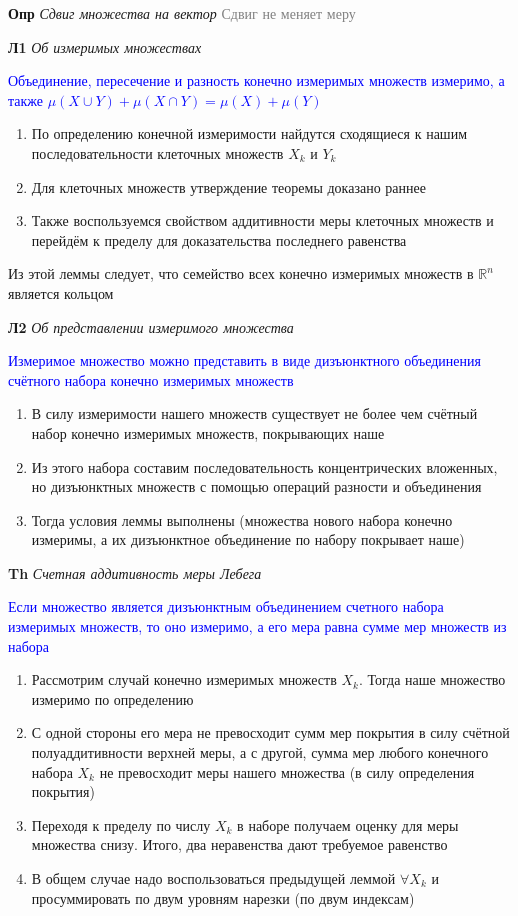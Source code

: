 \textbf{Опр} \textit{Сдвиг множества на вектор} \textcolor{gray}{Сдвиг не меняет меру}

\textbf{Л1} \textit{Об измеримых множествах}

\textcolor{blue}{Объединение, пересечение и разность конечно измеримых множеств измеримо, а также $\mu (X \cup Y) + \mu (X \cap Y) = \mu (X) + \mu (Y)$}

\begin{enumerate}
    \item По определению конечной измеримости найдутся сходящиеся к нашим последовательности клеточных множеств $X_k$ и $Y_k$
    \item Для клеточных множеств утверждение теоремы доказано раннее
    \item Также воспользуемся свойством аддитивности меры клеточных множеств и перейдём к пределу для доказательства
    последнего равенства
\end{enumerate}

Из этой леммы следует, что семейство всех конечно измеримых множеств в $\mathbb{R}^n$ является кольцом

\textbf{Л2} \textit{Об представлении измеримого множества}

\textcolor{blue}{Измеримое множество можно представить в виде дизъюнктного объединения счётного набора конечно измеримых множеств}

\begin{enumerate}
    \item В силу измеримости нашего множеств существует не более чем счётный набор конечно измеримых множеств, покрывающих наше
    \item Из этого набора составим последовательность концентрических вложенных, но дизъюнктных множеств с помощью операций разности и объединения
    \item Тогда условия леммы выполнены (множества нового набора конечно измеримы, а их дизъюнктное объединение по набору покрывает наше)
\end{enumerate}

\textbf{Th} \textit{Счетная аддитивность меры Лебега}

\textcolor{blue}{Если множество является дизъюнктным объединением счетного набора измеримых множеств, то оно
измеримо, а его мера равна сумме мер множеств из набора}

\begin{enumerate}
    \item Рассмотрим случай конечно измеримых множеств $X_k$.
    Тогда наше множество измеримо по определению
    \item С одной стороны его мера не превосходит сумм мер покрытия в силу счётной полуаддитивности верхней меры, а
    с другой, сумма мер любого конечного набора $X_k$ не превосходит меры нашего множества (в силу определения покрытия)
    \item Переходя к пределу по числу $X_k$ в наборе получаем оценку для меры множества снизу.
    Итого, два неравенства дают требуемое равенство
    \item В общем случае надо воспользоваться предыдущей леммой $\forall X_k$ и просуммировать по двум уровням нарезки (по двум индексам)
\end{enumerate}

